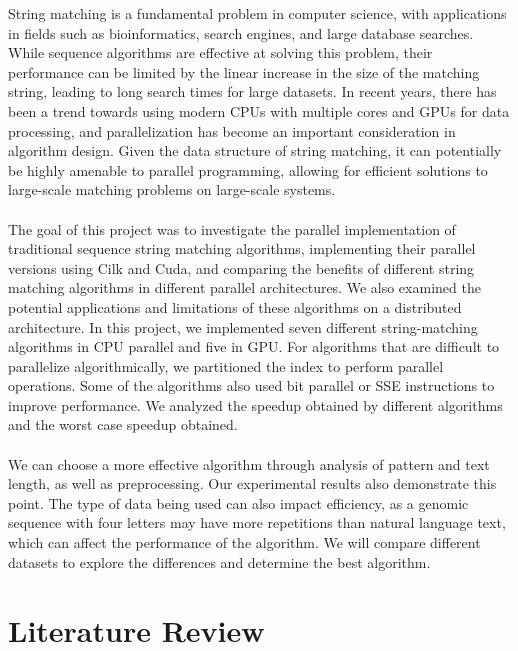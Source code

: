 \documentclass[11pt]{article}       %
\begin{document}
String matching is a fundamental problem in computer science, with applications in fields such as bioinformatics, search engines, and large database searches. While sequence algorithms are effective at solving this problem, their performance can be limited by the linear increase in the size of the matching string, leading to long search times for large datasets. In recent years, there has been a trend towards using modern CPUs with multiple cores and GPUs for data processing, and parallelization has become an important consideration in algorithm design. Given the data structure of string matching, it can potentially be highly amenable to parallel programming, allowing for efficient solutions to large-scale matching problems on large-scale systems.\\
\\The goal of this project was to investigate the parallel implementation of traditional sequence string matching algorithms, implementing their parallel versions using Cilk and Cuda, and comparing the benefits of different string matching algorithms in different parallel architectures. We also examined the potential applications and limitations of these algorithms on a distributed architecture. In this project, we implemented seven different string-matching algorithms in CPU parallel and five in GPU. For algorithms that are difficult to parallelize algorithmically, we partitioned the index to perform parallel operations. Some of the algorithms also used bit parallel or SSE instructions to improve performance. We analyzed the speedup obtained by different algorithms and the worst case speedup obtained.\\ 
\\We can choose a more effective algorithm through analysis of pattern and text length, as well as preprocessing. Our experimental results also demonstrate this point. The type of data being used can also impact efficiency, as a genomic sequence with four letters may have more repetitions than natural language text, which can affect the performance of the algorithm. We will compare different datasets to explore the differences and determine the best algorithm.\\




\section{Literature Review} \label{litrev}
\end{document}
